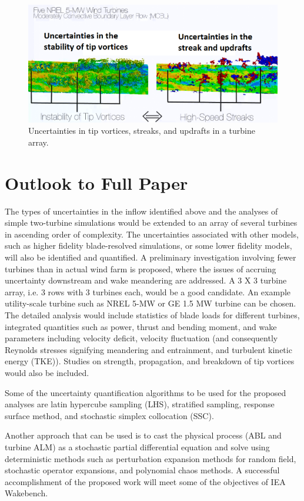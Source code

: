 \documentclass[]{aiaa-tc}%
\begin{document}
\begin{figure}
 \includegraphics[scale=0.25]{UQ2.png}
 \caption{Uncertainties in tip vortices, streaks, and updrafts in a turbine array.}
 \label{f:UQ2}
\end{figure}

\section{Outlook to Full Paper}

The types of uncertainties in the inflow identified above and the analyses of simple two-turbine simulations would be extended to an array of several turbines in ascending order of complexity. The uncertainties associated with other models, such as higher fidelity blade-resolved simulations, or some lower fidelity models, will also be identified and quantified. A preliminary investigation involving fewer turbines than in actual wind farm is proposed, where the issues of accruing uncertainty downstream and wake meandering are addressed. A 3 X 3 turbine array, i.e. 3 rows with 3 turbines each, would be a good candidate. An example utility-scale turbine such as NREL 5-MW or GE 1.5 MW turbine can be chosen. The detailed analysis would include statistics of blade loads for different turbines, integrated quantities such as power, thrust and bending moment, and wake parameters including velocity deficit, velocity fluctuation (and consequently Reynolds stresses signifying meandering and entrainment, and turbulent kinetic energy (TKE)). Studies on strength, propagation, and breakdown of tip vortices would also be included. 

Some of the uncertainty quantification algorithms to be used for the proposed analyses are latin hypercube sampling (LHS), stratified sampling, response surface method, and stochastic simplex collocation (SSC).

Another approach that can be used is to cast the physical process (ABL and turbine ALM) as a stochastic partial differential equation and solve using deterministic methods such as perturbation expansion methods for random field, stochastic operator expansions, and polynomial chaos methods.
A successful accomplishment of the proposed work will meet some of the objectives of IEA Wakebench.
\end{document}
